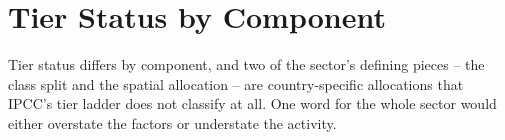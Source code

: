\section{Tier Status by Component}
\label{app:tiers}

Tier status differs by component, and two of the sector's defining pieces
-- the class split and the spatial allocation -- are country-specific
allocations that IPCC's tier ladder does not classify at all. One word for
the whole sector would either overstate the factors or understate the
activity.

